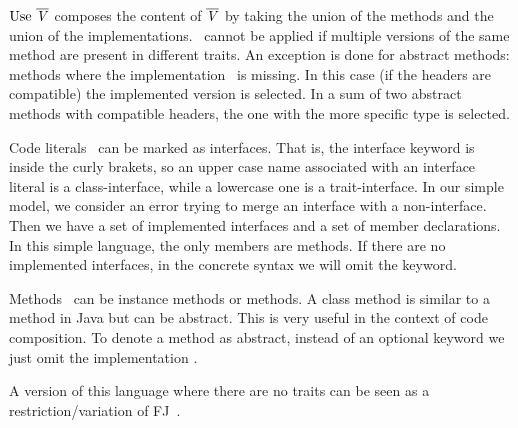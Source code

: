 $\use\ \overline\mV$ composes the content of $\overline{\mathit{V}}$
by taking the union of the methods and the union of the
implementations.
\use\ cannot be applied if multiple versions of the same method are
present in different traits.  An exception is done for abstract methods:
methods where the implementation \me\ is missing. In this case (if the
headers are compatible) the implemented version is selected.  In a sum
of two abstract methods with compatible headers, the one with the more
specific type is selected.

Code literals \mL\ can be marked as interfaces. 
That is, the interface keyword is inside the curly brakets, so an upper case name associated with an interface literal is a class-interface, while a lowercase one is a trait-interface.
In our simple model, we consider an error trying to merge an interface with a non-interface.
 Then we have a set of implemented interfaces and a set of member
  declarations. In this simple language, the only members are methods.
If there are no implemented interfaces, in the concrete syntax we will omit the \Q@implements@ keyword.

Methods \mMD~can be instance methods or \Q@class@ methods. A class method is similar to a \Q@static@ method in Java but can be abstract. This is very useful in the context of code composition.
To denote a method as abstract, instead of an optional keyword we just omit the implementation \me.

A version of this language where there are no traits can be seen 
as a restriction/variation of FJ~\cite{igarashi2001featherweight}.

